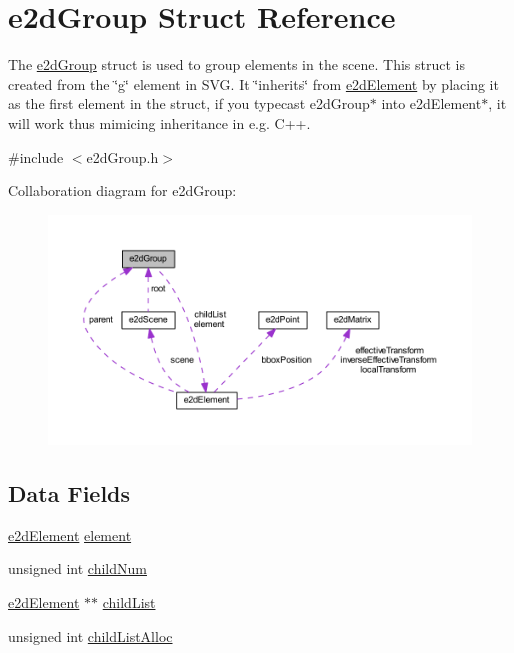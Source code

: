 \hypertarget{structe2dGroup}{\section{e2d\-Group Struct Reference}
\label{structe2dGroup}
}


The \hyperlink{structe2dGroup}{e2d\-Group} struct is used to group elements in the scene. This struct is created from the \char`\"{}g\char`\"{} element in S\-V\-G. It \char`\"{}inherits\char`\"{} from \hyperlink{structe2dElement}{e2d\-Element} by placing it as the first element in the struct, if you typecast e2d\-Group$\ast$ into e2d\-Element$\ast$, it will work thus mimicing inheritance in e.\-g. C++.  




{\ttfamily \#include $<$e2d\-Group.\-h$>$}



Collaboration diagram for e2d\-Group\-:\nopagebreak
\begin{figure}[H]
\begin{center}
\leavevmode
\includegraphics[width=350pt]{structe2dGroup__coll__graph}
\end{center}
\end{figure}
\subsection*{Data Fields}
\begin{DoxyCompactItemize}
\item 
\hyperlink{structe2dElement}{e2d\-Element} \hyperlink{structe2dGroup_a55bc7a3a0af41fba9e5b91f390c5928c}{element}
\item 
unsigned int \hyperlink{structe2dGroup_a0af3697c2c9df6ed0ddd340cded35d65}{child\-Num}
\item 
\hyperlink{structe2dElement}{e2d\-Element} $\ast$$\ast$ \hyperlink{structe2dGroup_a55f6dde874716dc99dcd270fc0999a01}{child\-List}
\item 
unsigned int \hyperlink{structe2dGroup_a9c89d7cf35b835ef1917855c78a79cc5}{child\-List\-Alloc}
\end{DoxyCompactItemize}



